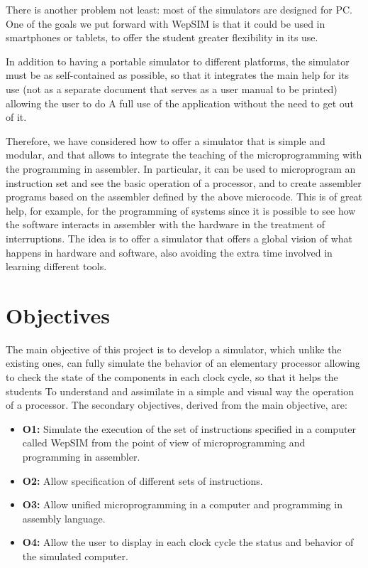 There is another problem not least: most of the simulators are designed for PC. One of the goals we put forward with WepSIM is that it could be used in smartphones or tablets, to offer the student greater flexibility in its use.

In addition to having a portable simulator to different platforms, the simulator must be as self-contained as possible, so that it integrates the main help for its use (not as a separate document that serves as a user manual to be printed) allowing the user to do A full use of the application without the need to get out of it.

Therefore, we have considered how to offer a simulator that is simple and modular, and that allows to integrate the teaching of the microprogramming with the programming in assembler. In particular, it can be used to microprogram an instruction set and see the basic operation of a processor, and to create assembler programs based on the assembler defined by the above microcode. This is of great help, for example, for the programming of systems since it is possible to see how the software interacts in assembler with the hardware in the treatment of interruptions. The idea is to offer a simulator that offers a global vision of what happens in hardware and software, also avoiding the extra time involved in learning different tools.


\section{Objectives}

The main objective of this project is to develop a simulator, which unlike the existing ones, can fully simulate the behavior of an elementary processor allowing to check the state of the components in each clock cycle, so that it helps the students To understand and assimilate in a simple and visual way the operation of a processor. The secondary objectives, derived from the main objective, are:

\begin{itemize}

\item \textbf{O1:} Simulate the execution of the set of instructions specified in a computer called WepSIM from the point of view of microprogramming and programming in assembler.

\item \textbf{O2:} Allow specification of different sets of instructions.

\item \textbf{O3:} Allow unified microprogramming in a computer and programming in assembly language.


\item \textbf{O4:} Allow the user to display in each clock cycle the status and behavior of the simulated computer.

\end{itemize}

